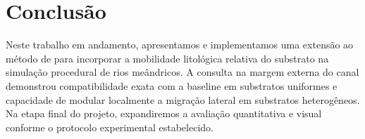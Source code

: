 \documentclass[9pt,a4paper,twocolumn]{extarticle}
\newif\ifmostrarorientacoes
\newcommand{\orientacao}[1]{%
  \ifmostrarorientacoes
    \par\smallskip
    \noindent\fcolorbox{black!35}{black!4}{%
      \parbox{0.94\columnwidth}{\fontsize{7.4}{8.2}\selectfont\textbf{Orientação aos autores:} #1}%
    }%
    \par\smallskip
  \fi
}
\begin{document}
\section{Conclusão}
\orientacao{Retome o problema, sintetize a contribuição e os resultados mais importantes.
Não introduza novos experimentos. Indique trabalhos futuros concretos.}

Neste trabalho em andamento, apresentamos e implementamos uma extensão ao método de \textcite{paris2023meandering} para incorporar a mobilidade litológica relativa do substrato na simulação procedural de rios meândricos. A consulta na margem externa do canal demonstrou compatibilidade exata com a baseline em substratos uniformes e capacidade de modular localmente a migração lateral em substratos heterogêneos. Na etapa final do projeto, expandiremos a avaliação quantitativa e visual conforme o protocolo experimental estabelecido.

\balance
\printbibliography[title={Referências}]
\end{document}
